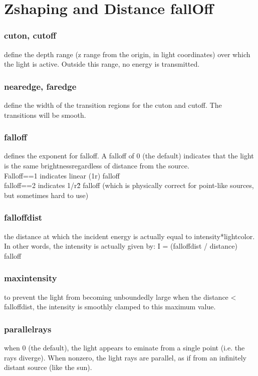 \documentclass[final,letterpaper,twoside,12pt]{report}
\begin{document}
\section {Zshaping and Distance fallOff}
\subsubsection {cuton, cutoff }
define the depth range (z range from the origin, in   light coordinates) over which the light is active.  Outside  this range, no energy is transmitted.
\smallskip
\subsubsection {nearedge, faredge}
define the width of the transition regions   for the cuton and cutoff.  The transitions will be smooth.
\smallskip
\subsubsection {falloff }
defines the exponent for falloff.  A falloff of 0 (the  default) indicates that the light is the same brightnessregardless of distance from the source.\\
Falloff==1 indicates  linear (1\/r) falloff\\
falloff==2 indicates 1/r\^2 falloff  (which is physically correct for point-like sources, but  sometimes hard to use)
\smallskip
\subsubsection {falloffdist}
the distance at which the incident energy is actually  equal to intensity*lightcolor.\\
 In other words, the intensity  is actually given by:   I = (falloffdist / distance) \^\\ falloff
\smallskip
\subsubsection {maxintensity}
to prevent the light from becoming unboundedly  large when the distance < falloffdist, the intensity is  smoothly clamped to this maximum value.
\smallskip
\subsubsection {parallelrays }
when 0 (the default), the light appears to eminate  from a single point (i.e. the rays diverge).  When nonzero,  the light rays are parallel, as if from an infinitely distant  source (like the sun).
\smallskip
\end{document}
